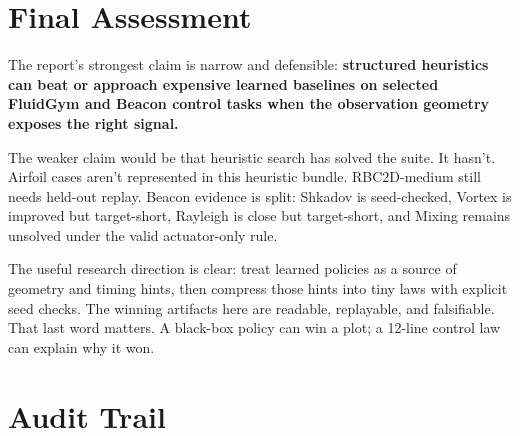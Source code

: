 \documentclass[10pt]{article}
\begin{document}
\section{Final Assessment}

The report's strongest claim is narrow and defensible: \textbf{structured heuristics can beat or approach expensive learned baselines on selected FluidGym and Beacon control tasks when the observation geometry exposes the right signal.}

The weaker claim would be that heuristic search has solved the suite. It hasn't. Airfoil cases aren't represented in this heuristic bundle. RBC2D-medium still needs held-out replay. Beacon evidence is split: Shkadov is seed-checked, Vortex is improved but target-short, Rayleigh is close but target-short, and Mixing remains unsolved under the valid actuator-only rule.

The useful research direction is clear: treat learned policies as a source of geometry and timing hints, then compress those hints into tiny laws with explicit seed checks. The winning artifacts here are readable, replayable, and falsifiable. That last word matters. A black-box policy can win a plot; a 12-line control law can explain why it won.

\appendix
\section{Audit Trail}
\end{document}
